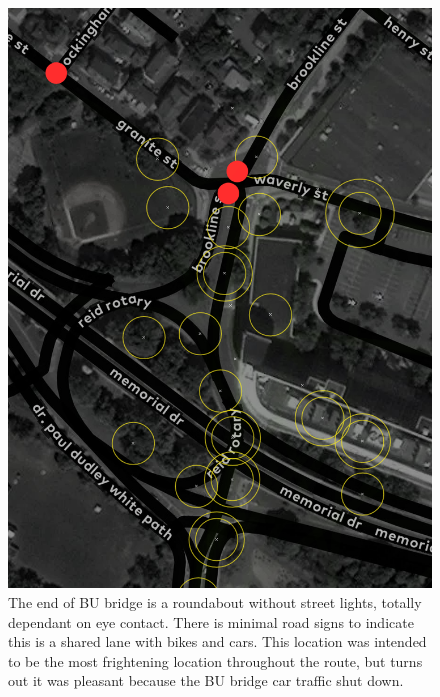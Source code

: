 \begin{figure}[!htb]
  \includegraphics{appendix/B/fig/overlap_roundabout.png}               
  \caption[`bad' reports at the junction of BU bridge and memorial drive]{The end of BU bridge is a roundabout without street lights, totally dependant on eye contact. There is minimal road signs to indicate this is a shared lane with bikes and cars. This location was intended to be the most frightening location throughout the route, but turns out it was pleasant because the BU bridge car traffic shut down.}
  \label{fig:bad_roudabaout}
\end{figure}